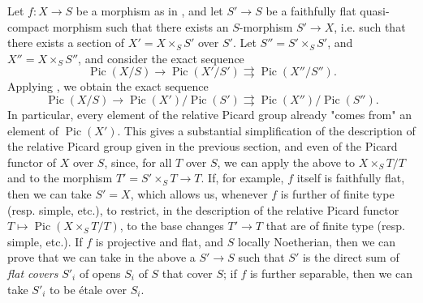 \begin{remark}\label{fga3.v-2-remark-2.6}
    Let $f\colon X\to S$ be a morphism as in , and let $S'\to S$ be a faithfully flat quasi-compact morphism such that there exists an $S$-morphism $S'\to X$, i.e. such that there exists a section of $X'=X\times_S S'$ over $S'$.
    Let $S''=S'\times_S S'$, and $X''=X\times_S S''$, and consider the exact sequence
    \[
        \operatorname{Pic}(X/S)
        \to \operatorname{Pic}(X'/S')
        \rightrightarrows \operatorname{Pic}(X''/S'').
    \]
    Applying , we obtain the exact sequence
    \[
        \operatorname{Pic}(X/S)
        \to \operatorname{Pic}(X')/\operatorname{Pic}(S')
        \rightrightarrows \operatorname{Pic}(X'')/\operatorname{Pic}(S'').
    \]
    In particular, every element of the relative Picard group already "comes from" an element of $\operatorname{Pic}(X')$.
    This gives a substantial simplification of the description of the relative Picard group given in the previous section, and even of the Picard functor of $X$ over $S$, since, for all $T$ over $S$, we can apply the above to $X\times_S T/T$ and to the morphism $T'=S'\times_S T\to T$.
    If, for example, $f$ itself is faithfully flat, then we can take $S'=X$, which allows us, whenever $f$ is further of finite type (resp. simple, etc.), to restrict, in the description of the relative Picard functor $T\mapsto\operatorname{Pic}(X\times_S T/T)$, to the base changes $T'\to T$ that are of finite type (resp. simple, etc.).
    If $f$ is projective and flat, and $S$ locally Noetherian, then we can prove that we can take in the above a $S'\to S$ such that $S'$ is the direct sum of \emph{flat covers} $S'_i$ of opens $S_i$ of $S$ that cover $S$;
    if $f$ is further separable, then we can take $S'_i$ to be étale over $S_i$.
\end{remark}
